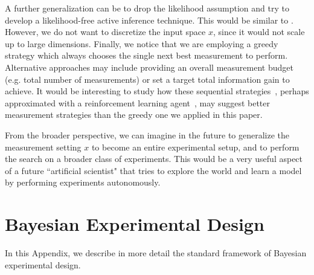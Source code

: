 \documentclass[10pt]{iopart}  %
\begin{document}
A further generalization can be to drop the likelihood assumption and try to develop a likelihood-free active inference technique.
This would be similar to \cite{cimini_deep_2023}.
However, we do not want to discretize the input space $x$, since it would not scale up to large dimensions.
Finally, we notice that we are employing a greedy strategy which always chooses the single next best measurement to perform. Alternative approaches may include providing an overall measurement budget (e.g. total number of measurements) or set a target total information gain to achieve.
It would be interesting to study how these sequential strategies~\cite{foster_deep_2021}, perhaps approximated with a reinforcement learning agent~\cite{sutton_reinforcement_2018, fiderer_neural-network_2021}, may suggest better measurement strategies than the greedy one we applied in this paper.

From the broader perspective, we can imagine in the future to generalize the measurement setting $x$ to become an entire experimental setup, and to perform the search on a broader class of experiments.
This would be a very useful aspect of a future ``artificial scientist" that tries to explore the world and learn a model by performing experiments autonomously.


\appendix
\setcounter{section}{0}

\section{Bayesian Experimental Design}
\label{app:bayes}
In this Appendix, we describe in more detail the standard framework of Bayesian experimental design.
\end{document}
